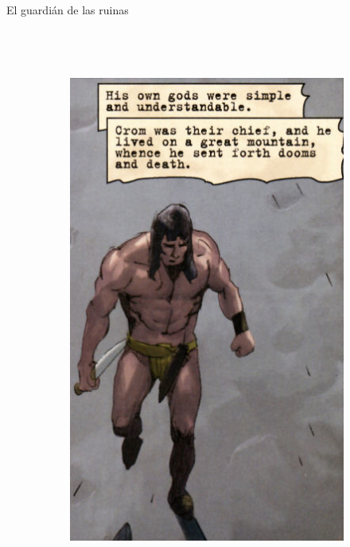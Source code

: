 \begin{frame}{El guardián de las ruinas}
\begin{columns}
\begin{figure}[htp]
			~
			\begin{subfigure}[b]{0.27\textwidth}
				\includegraphics[width=\textwidth]{img/conan/DH}
			\end{subfigure}
			~
			\begin{subfigure}[b]{0.23\textwidth}

\end{subfigure}
\end{figure}
\end{columns}
\end{frame}
